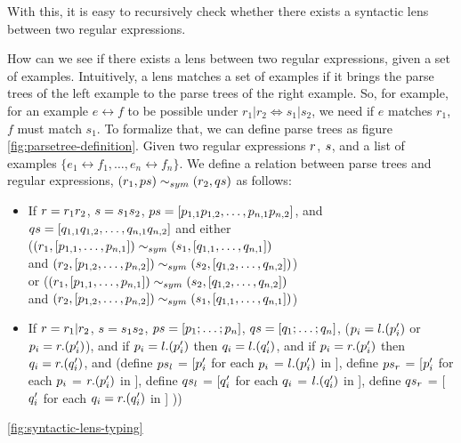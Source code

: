 With this, it is easy to recursively check whether there exists a syntactic lens between two regular expressions.

How can we see if there exists a lens between two regular expressions, given a set of examples.
Intuitively, a lens matches a set of examples if it brings the parse trees of the left example to the parse trees of the right example.
So, for example, for an example $e\leftrightarrow f$ to be possible under $r_1|r_2 \Leftrightarrow s_1|s_2$, we need if $e$ matches $r_1$, $f$ must match $s_1$.
To formalize that, we can define parse trees as figure \ref{fig:parsetree-definition}.
Given two regular expressions $r$, $s$, and a list of examples $\{e_1\leftrightarrow f_1,\ldots,e_n\leftrightarrow f_n\}$.
We define a relation between parse trees and regular expressions, $(r_1,ps) \sim_{sym} (r_2,qs)$ as follows:
\begin{itemize}
\item If $r = r_1 r_2$,
$s = s_1 s_2$,
$ps = [p_{1,1}p_{1,2}, \ldots, p_{n,1}p_{n,2}]$,
and $qs = [q_{1,1}q_{1,2}, \ldots, q_{n,1}q_{n,2}]$
and either\\
($(r_1,[p_{1,1}, \ldots,p_{n,1}]) \sim_{sym} (s_1,[q_{1,1}, \ldots, q_{n,1}])$\\
and
$(r_2,[p_{1,2}, \ldots,p_{n,2}]) \sim_{sym} (s_2,[q_{1,2}, \ldots, q_{n,2}])$)\\
or ($(r_1,[p_{1,1}, \ldots,p_{n,1}]) \sim_{sym} (s_2,[q_{1,2}, \ldots, q_{n,2}])$\\
and
$(r_2,[p_{1,2}, \ldots,p_{n,2}]) \sim_{sym} (s_1,[q_{1,1}, \ldots, q_{n,1}])$)
\item If $r = r_1 | r_2$,
$s = s_1 s_2$,
$ps = [p_1;\ldots;p_n]$, $qs = [q_1;\ldots;q_n]$,
($p_i = l.(p_i')$ or $p_i = r.(p_i')$),
and if $p_i = l.(p_i')$ then $q_i = l.(q_i')$,
and if $p_i = r.(p_i')$ then $q_i = r.(q_i')$,
and (define $ps_l$ = [$p_i'$ for each $p_i$ = $l.(p_i')$ in \ParseTrees],
define $ps_r$ = [$p_i'$ for each $p_i$ = $r.(p_i')$ in \ParseTrees],
define $qs_l$ = [$q_i'$ for each $q_i$ = $l.(q_i')$ in \ParseTreeAlts],
define $qs_r$ = [$q_i'$ for each $q_i = r.(q_i')$ in \ParseTreeAlts]
))
\end{itemize}
\ref{fig:syntactic-lens-typing}
\fi

